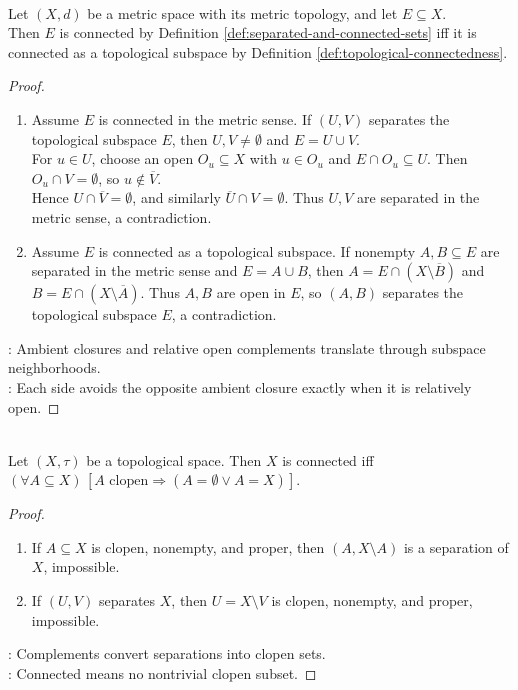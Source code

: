 \begin{proposition} \label{prop:metric-and-topological-connectedness-agree} \\
Let $(X,d)$ be a metric space with its metric topology, and let $E\subseteq X$.\\
Then $E$ is connected by Definition \ref{def:separated-and-connected-sets} iff it is connected as a topological subspace by Definition \ref{def:topological-connectedness}.
\begin{proof}
\begin{enumerate}[label=\roman*.]
\setlength{\itemsep}{0pt}
\item[$(\Rightarrow)$] Assume $E$ is connected in the metric sense. If $(U,V)$ separates the topological subspace $E$, then $U,V\neq\emptyset$ and $E=U\cup V$.\\
For $u\in U$, choose an open $O_u\subseteq X$ with $u\in O_u$ and $E\cap O_u\subseteq U$. Then $O_u\cap V=\emptyset$, so $u\notin\overline{V}$.\\
Hence $U\cap\overline{V}=\emptyset$, and similarly $\overline{U}\cap V=\emptyset$. Thus $U,V$ are separated in the metric sense, a contradiction.
\item[$(\Leftarrow)$] Assume $E$ is connected as a topological subspace. If nonempty $A,B\subseteq E$ are separated in the metric sense and $E=A\cup B$, then $A=E\cap(X\setminus\overline{B})$ and $B=E\cap(X\setminus\overline{A})$. Thus $A,B$ are open in $E$, so $(A,B)$ separates the topological subspace $E$, a contradiction.
\end{enumerate}
: Ambient closures and relative open complements translate through subspace neighborhoods.\\
: Each side avoids the opposite ambient closure exactly when it is relatively open.
\end{proof}
\end{proposition}

\begin{proposition} \label{prop:topological-connected-clopen-characterization} \\
Let $(X,\tau)$ be a topological space. Then $X$ is connected iff $(\forall A\subseteq X)\,[A\text{ clopen}\Rightarrow(A=\emptyset\lor A=X)]$.
\begin{proof}
\begin{enumerate}[label=\roman*.]
\setlength{\itemsep}{0pt}
\item[$(\Rightarrow)$] If $A\subseteq X$ is clopen, nonempty, and proper, then $(A,X\setminus A)$ is a separation of $X$, impossible.
\item[$(\Leftarrow)$] If $(U,V)$ separates $X$, then $U=X\setminus V$ is clopen, nonempty, and proper, impossible.
\end{enumerate}
: Complements convert separations into clopen sets.\\
: Connected means no nontrivial clopen subset.
\end{proof}
\end{proposition}

